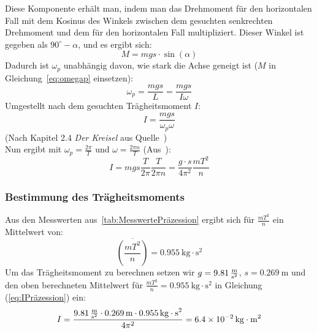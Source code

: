 \documentclass{article}
\begin{document}
	Diese Komponente erhält man, indem man das Drehmoment für den horizontalen Fall mit dem Kosinus des Winkels zwischen dem gesuchten senkrechten Drehmoment und dem für den horizontalen Fall multipliziert. 
	Dieser Winkel ist gegeben als \(90^{\circ} - \alpha\), und es ergibt sich:
	\begin{equation}
		M = m g s \cdot \sin(\alpha)
	\end{equation}
	Dadurch ist \( \omega_p \) unabhängig davon, wie stark die Achse geneigt ist (\(M\) in Gleichung~\ref{eq:omegap} einsetzen):
	\begin{equation}
		\omega_p = \frac{ m g s }{L} = \frac{ m g s }{ I \omega}
	\end{equation}
	Umgestellt nach dem gesuchten Trägheitsmoment \(I\):
	\begin{equation}
		I = \frac{ m g s }{\omega_p \omega}
	\end{equation}
	(Nach Kapitel 2.4 \textit{Der Kreisel} aus Quelle~\cite{Gerthsen}) \\
	Nun ergibt mit \( \omega_p = \frac{ 2 \pi }{ T } \) und \( \omega = \frac{2 \pi n}{ T } \) (Aus~\cite{AnleitungPraktikum}):
	\begin{equation}\label{eq:IPräzession}
		I = m g s \frac{T}{2 \pi} \frac{T}{2 \pi n} = \frac{g \cdot s}{ 4 \pi^2 } \frac{ m T^2 }{ n }
	\end{equation}

	\subsubsection{Bestimmung des Trägheitsmoments}
	Aus den Messwerten aus~\ref{tab:MesswertePräzession} ergibt sich für \( \frac{mT^2}{n} \) ein Mittelwert von:
	\begin{equation}
		\overline{ \left( \frac{ m T^2 }{n} \right) } = \SI{0,955}{\kilogram \cdot \second^2}
	\end{equation}
	Um das Trägheitsmoment zu berechnen setzen wir \(g = \SI{9,81}{ \frac{\metre}{\second^2} } \), \(s = \SI{0,269}{\metre} \)
	und den oben berechneten Mittelwert für \( \frac{ m T^2 }{n} = \SI{0,955}{\kilogram \cdot \second^2} \) in Gleichung (\ref{eq:IPräzession}) ein:
	\begin{equation}
		I = \frac{ \SI{9,81}{ \frac{\metre}{\second^2} } \cdot \SI{0,269}{\metre} \cdot \SI{0,955}{\kilogram \cdot \second^2} }{ 4 \pi^2 } = \SI{6,4e-2}{\kilogram \cdot \metre^2}
	\end{equation}
\end{document}
